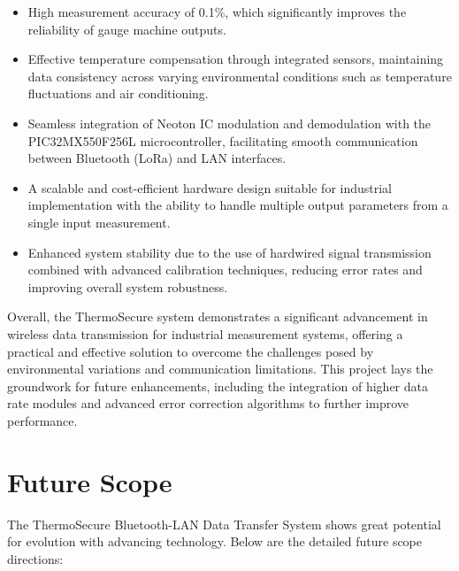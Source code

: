 \documentclass[12pt]{report}
\begin{document}
\begin{itemize}[leftmargin=*]
    \item High measurement accuracy of 0.1\%, which significantly improves the reliability of gauge machine outputs.
    \item Effective temperature compensation through integrated sensors, maintaining data consistency across varying environmental conditions such as temperature fluctuations and air conditioning.
    \item Seamless integration of Neoton IC modulation and demodulation with the PIC32MX550F256L microcontroller, facilitating smooth communication between Bluetooth (LoRa) and LAN interfaces.
    \item A scalable and cost-efficient hardware design suitable for industrial implementation with the ability to handle multiple output parameters from a single input measurement.
    \item Enhanced system stability due to the use of hardwired signal transmission combined with advanced calibration techniques, reducing error rates and improving overall system robustness.
\end{itemize}

Overall, the ThermoSecure system demonstrates a significant advancement in wireless data transmission for industrial measurement systems, offering a practical and effective solution to overcome the challenges posed by environmental variations and communication limitations. This project lays the groundwork for future enhancements, including the integration of higher data rate modules and advanced error correction algorithms to further improve performance.

\section{Future Scope}

The ThermoSecure Bluetooth-LAN Data Transfer System shows great potential for evolution with advancing technology. Below are the detailed future scope directions:
\end{document}
